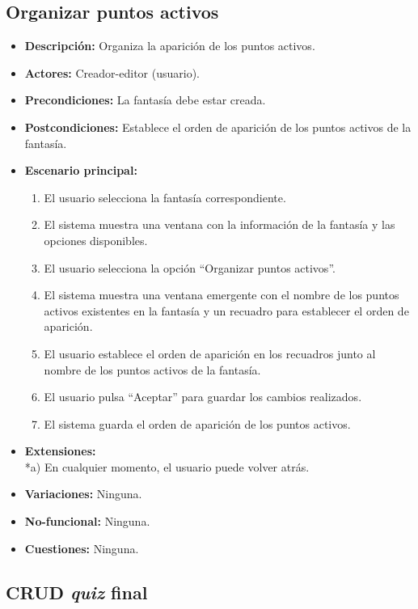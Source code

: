 \subsection{Organizar puntos activos}
\begin{itemize}
	\item \textbf{Descripción:} Organiza la aparición de los puntos activos.
	\item \textbf{Actores:} Creador-editor (usuario).
	\item \textbf{Precondiciones:} La fantasía debe estar creada.
	\item \textbf{Postcondiciones:} Establece el orden de aparición de los puntos activos de la fantasía.
	\item \textbf{Escenario principal:}
	\begin{enumerate}
		\item El usuario selecciona la fantasía correspondiente.
		\item El sistema muestra una ventana con la información de la fantasía y las opciones disponibles.
		\item El usuario selecciona la opción ``Organizar puntos activos''.
		\item El sistema muestra una ventana emergente con el nombre de los puntos activos existentes en la fantasía y un recuadro para establecer el orden de aparición.
		\item El usuario establece el orden de aparición en los recuadros junto al nombre de los puntos activos de la fantasía.
		\item El usuario pulsa ``Aceptar'' para guardar los cambios realizados.
		\item El sistema guarda el orden de aparición de los puntos activos.
	\end{enumerate}
	\item \textbf{Extensiones:} \\ *a) En cualquier momento, el usuario puede volver atrás.
	\item \textbf{Variaciones:} Ninguna.
	\item \textbf{No-funcional:} Ninguna.
	\item \textbf{Cuestiones:} Ninguna.
\end{itemize}

\subsection{CRUD \textit{quiz} final}
\hypertarget{crearquizfinal}{}
